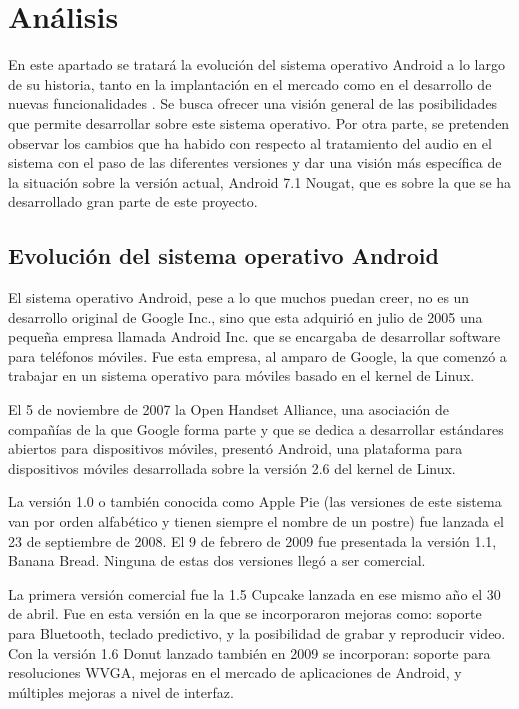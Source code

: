 \chapter{Análisis}
En este apartado se tratará la evolución del sistema operativo Android a lo largo de su historia, tanto en la implantación en el mercado como en el desarrollo de nuevas funcionalidades \cite{history}. Se busca ofrecer una visión general de las posibilidades que permite desarrollar sobre este sistema operativo. Por otra parte, se pretenden observar los cambios que ha habido con respecto al tratamiento del audio en el sistema con el paso de las diferentes versiones y dar una visión más específica de la situación sobre la versión actual, Android 7.1 Nougat, que es sobre la que se ha desarrollado gran parte de este proyecto.


\section{Evolución del sistema operativo Android}
El sistema operativo Android, pese a lo que muchos puedan creer, no es un desarrollo original de Google Inc., sino que esta adquirió en julio de 2005 una pequeña empresa llamada Android Inc. que se encargaba de desarrollar software para teléfonos móviles. Fue esta empresa, al amparo de Google, la que comenzó a trabajar en un sistema operativo para móviles basado en el kernel de Linux.

El 5 de noviembre de 2007 la Open Handset Alliance, una asociación de compañías de la que Google forma parte y que se dedica a desarrollar estándares abiertos para dispositivos móviles, presentó Android, una plataforma para dispositivos móviles desarrollada sobre la versión 2.6 del kernel de Linux.

La versión 1.0 o también conocida como Apple Pie (las versiones de este sistema van por orden alfabético y tienen siempre el nombre de un postre) fue lanzada el 23 de septiembre de 2008. El 9 de febrero de 2009 fue presentada la versión 1.1, Banana Bread. Ninguna de estas dos versiones llegó a ser comercial.

La primera versión comercial fue la 1.5 Cupcake lanzada en ese mismo año el 30 de abril. Fue en esta versión en la que se incorporaron mejoras como: soporte para Bluetooth, teclado predictivo, y la posibilidad de grabar y reproducir video. Con la versión 1.6 Donut lanzado también en 2009 se incorporan: soporte para resoluciones \gls{WVGA}, mejoras en el mercado de aplicaciones de Android, y múltiples mejoras a nivel de interfaz.


